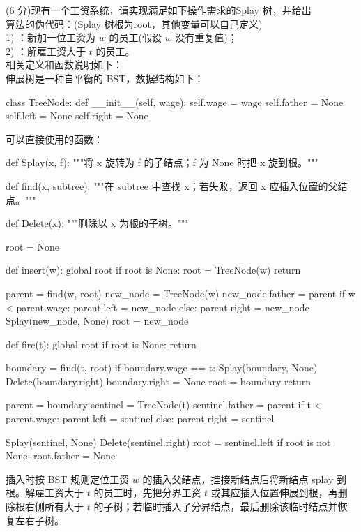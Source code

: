 \begin{question}
(6 分)现有一个工资系统，请实现满足如下操作需求的Splay 树，并给出\\
算法的伪代码：(Splay 树根为root，其他变量可以自己定义)\\
1) \texttt{}：新加一位工资为 $w$ 的员工(假设 $w$ 没有重复值)；\\
2) \texttt{}：解雇工资大于 $t$ 的员工。\\
相关定义和函数说明如下：\\
伸展树是一种自平衡的 BST，数据结构如下：
\begin{pycode}
class TreeNode:
    def __init__(self, wage):
        self.wage = wage
        self.father = None
        self.left = None
        self.right = None
\end{pycode}
可以直接使用的函数：
\begin{pycode}
def Splay(x, f):
    """将 x 旋转为 f 的子结点；f 为 None 时把 x 旋到根。"""


def find(x, subtree):
    """在 subtree 中查找 x；若失败，返回 x 应插入位置的父结点。"""


def Delete(x):
    """删除以 x 为根的子树。"""


root = None


def insert(w):
    global root
    if root is None:
        root = TreeNode(w)
        return

    parent = find(w, root)
    new_node = TreeNode(w)
    new_node.father = parent
    if w < parent.wage:
        parent.left = new_node
    else:
        parent.right = new_node
    Splay(new_node, None)
    root = new_node


def fire(t):
    global root
    if root is None:
        return

    boundary = find(t, root)
    if boundary.wage == t:
        Splay(boundary, None)
        Delete(boundary.right)
        boundary.right = None
        root = boundary
        return

    parent = boundary
    sentinel = TreeNode(t)
    sentinel.father = parent
    if t < parent.wage:
        parent.left = sentinel
    else:
        parent.right = sentinel

    Splay(sentinel, None)
    Delete(sentinel.right)
    root = sentinel.left
    if root is not None:
        root.father = None
\end{pycode}

\begin{solution}
插入时按 BST 规则定位工资 $w$ 的插入父结点，挂接新结点后将新结点 splay 到根。解雇工资大于 $t$ 的员工时，先把分界工资 $t$ 或其应插入位置伸展到根，再删除根右侧所有大于 $t$ 的子树；若临时插入了分界结点，最后删除该临时结点并恢复左右子树。
\end{solution}
\end{question}

